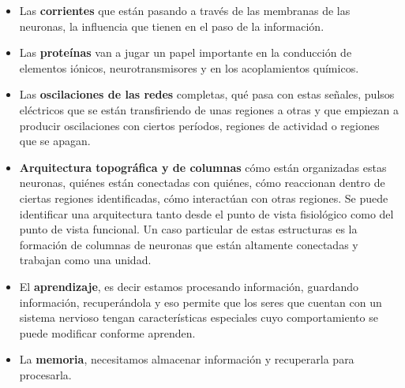 \documentclass{article}
\begin{document}
\begin{itemize}
 \item Las \textbf{corrientes} que están pasando a través de las membranas de las neuronas, la influencia que tienen en el paso de la información. 
 
 \item Las \textbf{proteínas} van a jugar un papel importante en la conducción de elementos iónicos, neurotransmisores y en los acoplamientos químicos.
\end{itemize}


\begin{itemize}
 \item Las \textbf{oscilaciones de las redes} completas, qué pasa con estas señales, pulsos eléctricos que se están transfiriendo de unas regiones a otras y que empiezan a producir oscilaciones con ciertos períodos,  regiones de actividad o regiones que se apagan.
 
 \item \textbf{Arquitectura topográfica y de columnas} cómo están organizadas estas neuronas, quiénes están conectadas con quiénes, cómo reaccionan dentro de ciertas regiones identificadas, cómo interactúan con otras regiones. Se puede identificar una arquitectura tanto desde el punto de vista fisiológico como del punto de vista funcional. Un caso particular de estas estructuras es la formación de columnas de neuronas que están altamente conectadas y trabajan como una unidad.
 
 \item El \textbf{aprendizaje}, es decir estamos procesando información, guardando información, recuperándola y eso permite que los seres que cuentan con un sistema nervioso tengan características especiales cuyo comportamiento se puede modificar conforme aprenden. 
 
 \item La \textbf{memoria}, necesitamos almacenar información y recuperarla para procesarla. 
\end{itemize}


\printbibliography[keyword={latex},title={Referencias}]
\end{document}
